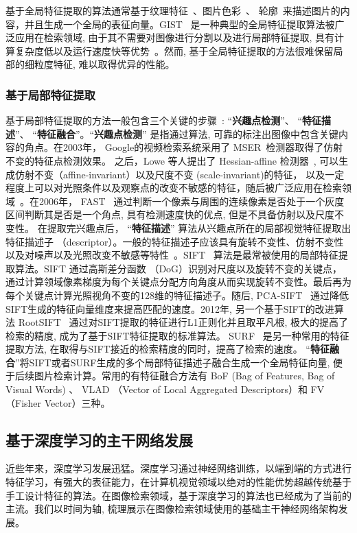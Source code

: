 基于全局特征提取的算法通常基于纹理特征~\cite{park2002fast,wang2014content}、图片色彩~\cite{wang2011interactive}\cite{wengert2011bag}、 轮廓~\cite{wang2006large}来描述图片的内容，并且生成一个全局的表征向量。GIST~\cite{friedman1979framing,torralba2003context} 是一种典型的全局特征提取算法被广泛应用在检索领域, 由于其不需要对图像进行分割以及进行局部特征提取, 具有计算复杂度低以及运行速度快等优势~\cite{zhou2017recent}。然而, 基于全局特征提取的方法很难保留局部的细粒度特征, 难以取得优异的性能。
\subsubsection{基于局部特征提取}
基于局部特征提取的方法一般包含三个关键的步骤~\cite{zhou2017recent}: ``\textbf{兴趣点检测}''、 ``\textbf{特征描述}''、 ``\textbf{特征融合}''。``\textbf{兴趣点检测}'' 是指通过算法, 可靠的标注出图像中包含关键内容的角点。在2003年， Google的视频检索系统采用了 MSER~\cite{matas2004robust}检测器取得了仿射不变的特征点检测效果。 之后，Lowe 等人提出了 Hessian-affine 检测器~\cite{lowe2004distinctive}, 可以生成仿射不变（affine-invariant）以及尺度不变 (scale-invariant)的特征， 以及一定程度上可以对光照条件以及观察点的改变不敏感的特征，随后被广泛应用在检索领域~\cite{philbin2007object}。在2006年， FAST~\cite{rosten2008faster} 通过判断一个像素与周围的连续像素是否处于一个灰度区间判断其是否是一个角点, 具有检测速度快的优点, 但是不具备仿射以及尺度不变性。 在提取完兴趣点后， ``\textbf{特征描述}'' 算法从兴趣点所在的局部视觉特征提取出特征描述子 （descriptor）。一般的特征描述子应该具有旋转不变性、仿射不变性以及对噪声以及光照改变不敏感等特性~\cite{zhou2017recent}。SIFT ~\cite{lowe2004distinctive}算法是最常被使用的局部特征提取算法。SIFT 通过高斯差分函数 （DoG）识别对尺度以及旋转不变的关键点，通过计算领域像素梯度为每个关键点分配方向角度从而实现旋转不变性。最后再为每个关键点计算光照视角不变的128维的特征描述子。随后, PCA-SIFT~\cite{ke2004pca} 通过降低SIFT生成的特征向量维度来提高匹配的速度。2012年, 另一个基于SIFT的改进算法 RootSIFT~\cite{arandjelovic2012three} 通过对SIFT提取的特征进行L1正则化并且取平凡根, 极大的提高了检索的精度, 成为了基于SIFT特征提取的标准算法。 SURF~\cite{bay2006surf} 是另一种常用的特征提取方法, 在取得与SIFT接近的检索精度的同时，提高了检索的速度。 ``\textbf{特征融合}''将SIFT或者SURF生成的多个局部特征描述子融合生成一个全局特征向量, 便于后续图片检索计算。常用的有特征融合方法有 BoF (Bag of Features, Bag of Visual Words) 、 VLAD （Vector of Local Aggregated Descriptors）和 FV （Fisher Vector）三种。
\subsection{基于深度学习的主干网络发展}
近些年来，深度学习发展迅猛。深度学习通过神经网络训练，以端到端的方式进行特征学习，有强大的表征能力，在计算机视觉领域以绝对的性能优势超越传统基于手工设计特征的算法。在图像检索领域，基于深度学习的算法也已经成为了当前的主流。我们以时间为轴, 梳理展示在图像检索领域使用的基础主干神经网络架构发展。
